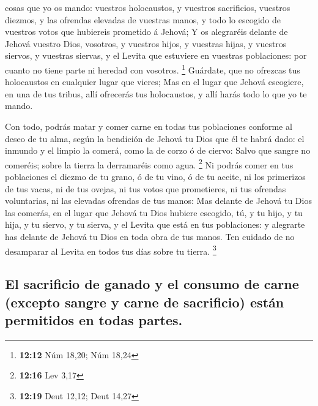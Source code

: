 cosas que yo os mando: vuestros holocaustos, y vuestros sacrificios,
vuestros diezmos, y las ofrendas elevadas de vuestras manos, y todo lo
escogido de vuestros votos que hubiereis prometido á Jehová;
 Y os alegraréis delante de Jehová vuestro Dios, vosotros,
y vuestros hijos, y vuestras hijas, y vuestros siervos, y vuestras
siervas, y el Levita que estuviere en vuestras poblaciones: por cuanto
no tiene parte ni heredad con vosotros. \footnote{\textbf{12:12} Núm
  18,20; Núm 18,24}  Guárdate, que no ofrezcas tus
holocaustos en cualquier lugar que vieres;  Mas en el lugar
que Jehová escogiere, en una de tus tribus, allí ofrecerás tus
holocaustos, y allí harás todo lo que yo te mando.

 Con todo, podrás matar y comer carne en todas tus
poblaciones conforme al deseo de tu alma, según la bendición de Jehová
tu Dios que él te habrá dado: el inmundo y el limpio la comerá, como la
de corzo ó de ciervo:  Salvo que sangre no comeréis; sobre
la tierra la derramaréis como agua. \footnote{\textbf{12:16} Lev 3,17}
 Ni podrás comer en tus poblaciones el diezmo de tu grano,
ó de tu vino, ó de tu aceite, ni los primerizos de tus vacas, ni de tus
ovejas, ni tus votos que prometieres, ni tus ofrendas voluntarias, ni
las elevadas ofrendas de tus manos:  Mas delante de Jehová
tu Dios las comerás, en el lugar que Jehová tu Dios hubiere escogido,
tú, y tu hijo, y tu hija, y tu siervo, y tu sierva, y el Levita que está
en tus poblaciones: y alegrarte has delante de Jehová tu Dios en toda
obra de tus manos.  Ten cuidado de no desamparar al Levita
en todos tus días sobre tu tierra. \footnote{\textbf{12:19} Deut 12,12;
  Deut 14,27}

\hypertarget{el-sacrificio-de-ganado-y-el-consumo-de-carne-excepto-sangre-y-carne-de-sacrificio-estuxe1n-permitidos-en-todas-partes.}{%
\subsection{El sacrificio de ganado y el consumo de carne (excepto
sangre y carne de sacrificio) están permitidos en todas
partes.}\label{el-sacrificio-de-ganado-y-el-consumo-de-carne-excepto-sangre-y-carne-de-sacrificio-estuxe1n-permitidos-en-todas-partes.}}

